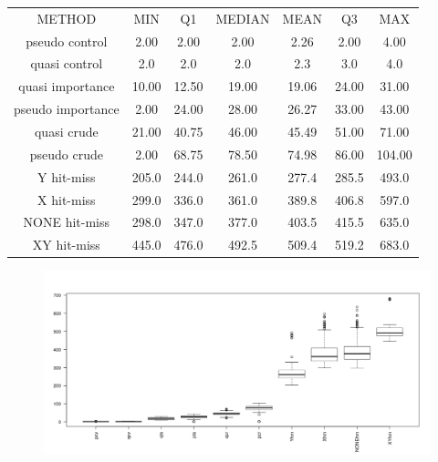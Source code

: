 \documentclass{article}
\begin{document}
\begin{center}
\begin{tabular}{ c c c c c c c}
METHOD & MIN  &  Q1 & MEDIAN & MEAN & Q3 & MAX \\
pseudo control & 2.00 & 2.00 & 2.00 & 2.26 & 2.00 & 4.00 \\
quasi control & 2.0 & 2.0 & 2.0 & 2.3 & 3.0 & 4.0 \\
quasi importance & 10.00 & 12.50 & 19.00 & 19.06 & 24.00 & 31.00 \\
pseudo importance & 2.00 & 24.00 & 28.00 & 26.27 & 33.00 & 43.00 \\
quasi crude & 21.00 & 40.75 & 46.00 & 45.49 & 51.00 & 71.00 \\
pseudo crude & 2.00 & 68.75 & 78.50 & 74.98 & 86.00 & 104.00 \\
Y hit-miss &  205.0 & 244.0 & 261.0 & 277.4 & 285.5 & 493.0 \\
X hit-miss & 299.0 & 336.0 & 361.0 & 389.8 & 406.8 & 597.0 \\
NONE hit-miss & 298.0 & 347.0 & 377.0 & 403.5 & 415.5 & 635.0 \\
XY hit-miss & 445.0 & 476.0 & 492.5 & 509.4 & 519.2 & 683.0
 \end{tabular}
\end{center}

\begin{figure}[htbp]
\begin{center}
\includegraphics[width=0.8\paperwidth]{Rplot01.png}
\end{center}
\label{fig:boxplots}
\end{figure}
\end{document}
